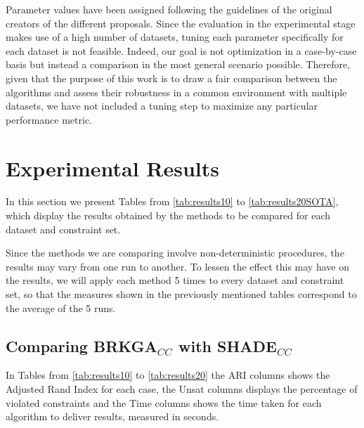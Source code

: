 \documentclass[review]{elsarticle}
\begin{document}
Parameter values have been assigned following the guidelines of the original creators of the different proposals. Since the evaluation in the experimental stage makes use of a high number of datasets, tuning each parameter specifically for each dataset is not feasible. Indeed, our goal is not optimization in a case-by-case basis but instead a comparison in the most general scenario possible. Therefore, given that the purpose of this work is to draw a fair comparison between the algorithms and assess their robustness in a common environment with multiple datasets, we have not included a tuning step to maximize any particular performance metric.

\section{Experimental Results} \label{sec:results}

In this section we present Tables from \ref{tab:results10} to \ref{tab:results20SOTA}, which display the results obtained by the methods to be compared for each dataset and constraint set.

Since the methods we are comparing involve non-deterministic procedures, the results may vary from one run to another. To lessen the effect this may have on the results, we will apply each method 5 times to every dataset and constraint set, so that the measures shown in the previously mentioned tables correspond to the average of the 5 runs.

\subsection{Comparing BRKGA$_{CC}$ with SHADE$_{CC}$}

In Tables from \ref{tab:results10} to \ref{tab:results20} the ARI columns shows the Adjusted Rand Index for each case, the Unsat columns displays the percentage of violated constraints and the Time columns shows the time taken for each algorithm to deliver results, measured in seconds.
\end{document}
